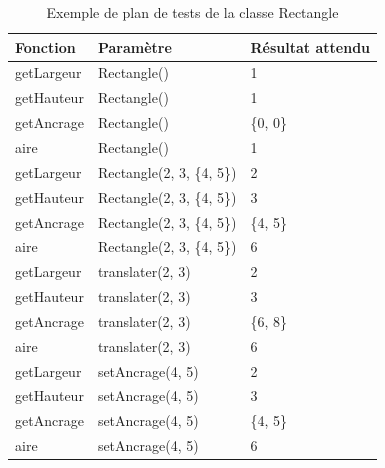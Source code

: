 \begin{table}[H]
    \centering
    \caption{Exemple de plan de tests de la classe Rectangle}
    \begin{tabular}{p{2in}p{2in}p{2in}}
        \hline
        \bfseries Fonction & \bfseries Paramètre & \bfseries Résultat attendu\\
        \hline
        getLargeur & Rectangle() & 1\\
        getHauteur & Rectangle() & 1\\
        getAncrage & Rectangle() & \{0, 0\}\\
        aire & Rectangle() & 1\\
        \hline
        getLargeur & Rectangle(2, 3, \{4, 5\}) & 2\\
        getHauteur & Rectangle(2, 3, \{4, 5\}) & 3\\
        getAncrage & Rectangle(2, 3, \{4, 5\}) & \{4, 5\}\\
        aire & Rectangle(2, 3, \{4, 5\}) & 6\\
        \hline
        getLargeur & translater(2, 3) & 2\\
        getHauteur & translater(2, 3) & 3\\
        getAncrage & translater(2, 3) & \{6, 8\}\\
        aire & translater(2, 3) & 6\\
        \hline
        getLargeur & setAncrage({4, 5}) & 2\\
        getHauteur & setAncrage({4, 5}) & 3\\
        getAncrage & setAncrage({4, 5}) & \{4, 5\}\\
        aire & setAncrage({4, 5}) & 6\\
        \hline
    \end{tabular}
\end{table}
